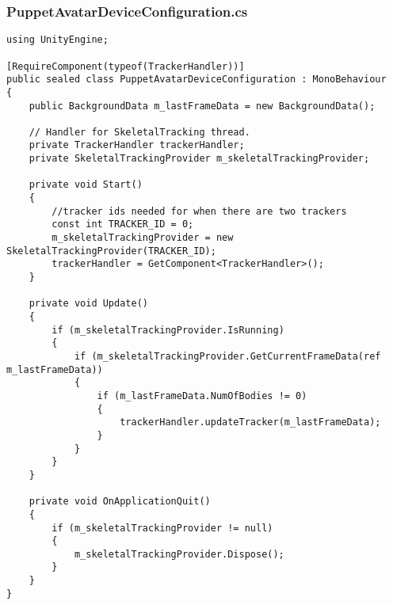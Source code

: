 \subsubsection*{PuppetAvatarDeviceConfiguration.cs}
\begin{verbatim}
﻿using UnityEngine;

[RequireComponent(typeof(TrackerHandler))]
public sealed class PuppetAvatarDeviceConfiguration : MonoBehaviour
{
    public BackgroundData m_lastFrameData = new BackgroundData();

    // Handler for SkeletalTracking thread.
    private TrackerHandler trackerHandler;
    private SkeletalTrackingProvider m_skeletalTrackingProvider;

    private void Start()
    {
        //tracker ids needed for when there are two trackers
        const int TRACKER_ID = 0;
        m_skeletalTrackingProvider = new SkeletalTrackingProvider(TRACKER_ID);
        trackerHandler = GetComponent<TrackerHandler>();
    }

    private void Update()
    {
        if (m_skeletalTrackingProvider.IsRunning)
        {
            if (m_skeletalTrackingProvider.GetCurrentFrameData(ref m_lastFrameData))
            {
                if (m_lastFrameData.NumOfBodies != 0)
                {
                    trackerHandler.updateTracker(m_lastFrameData);
                }
            }
        }
    }

    private void OnApplicationQuit()
    {
        if (m_skeletalTrackingProvider != null)
        {
            m_skeletalTrackingProvider.Dispose();
        }
    }
}
\end{verbatim}
